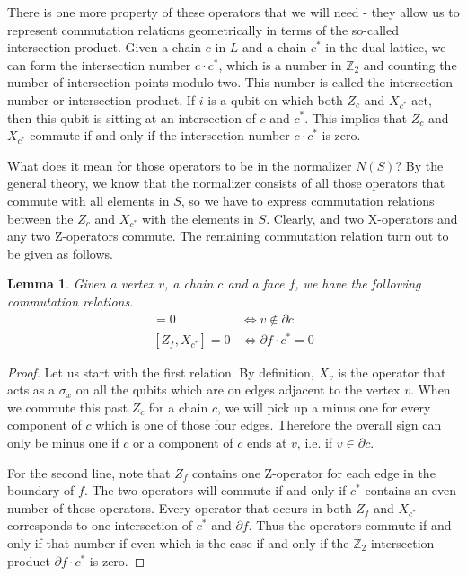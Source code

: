\documentclass[a4paper, draft]{article}
\theoremstyle{own}
\newtheorem{lem}[thm]{Lemma}
\theoremstyle{remark}
\newcommand{\Z}{\mathbb{Z}}
\begin{document}
There is one more property of these operators that we will need - they allow us to represent commutation relations geometrically in terms of the so-called intersection product. Given a chain $c$ in $L$ and a chain $c^*$ in the dual lattice, we can form the intersection number $c \cdot c^*$, which is a number in $\Z_2$ and counting the number of intersection points modulo two. This number is called the intersection number or intersection product. If $i$ is a qubit on which both $Z_c$ and $X_{c^*}$ act, then this qubit is sitting at an intersection of $c$ and $c^*$. This implies that $Z_c$ and $X_{c^*}$ commute if and only if the intersection number $c \cdot c^*$ is zero.

What does it mean for those operators to be in the normalizer $N(S)$? By the general theory, we know that the normalizer consists of all those operators that commute with all elements in $S$, so we have to express commutation relations between the $Z_c$ and $X_{c^*}$ with the elements in $S$. Clearly, and two X-operators and any two Z-operators commute. The remaining commutation relation turn out to be given as follows.

\begin{lem}\label{lem:commutators}
Given a vertex $v$, a chain $c$ and a face $f$, we have the following commutation relations.
\begin{align*}
[ Z_c, X_v  ] = 0 & \Leftrightarrow v \notin \partial c \\
[ Z_f, X_{c^*}  ] = 0 & \Leftrightarrow \partial f  \cdot c^* = 0
\end{align*}
\end{lem}

\begin{proof}
Let us start with the first relation. By definition, $X_v$ is the operator that acts as a $\sigma_x$ on all the qubits which are on edges adjacent to the vertex $v$. When we commute this past $Z_c$ for a chain $c$, we will pick up a minus one for every component of $c$ which is one of those four edges. Therefore the overall sign can only be minus one if $c$ or a component of $c$ ends at $v$, i.e. if $v \in \partial c$. 

For the second line, note that $Z_f$ contains one Z-operator for each edge in the boundary of $f$. The two operators will commute if and only if $c^*$ contains an even number of these operators. Every operator that occurs in both $Z_f$ and $X_{c^*}$ corresponds to one intersection of $c^*$ and $\partial f$. Thus the operators commute if and only if that number if even which is the case if and only if the $\Z_2$ intersection product $\partial f \cdot c^*$ is zero. 
\end{proof} 
\end{document}

